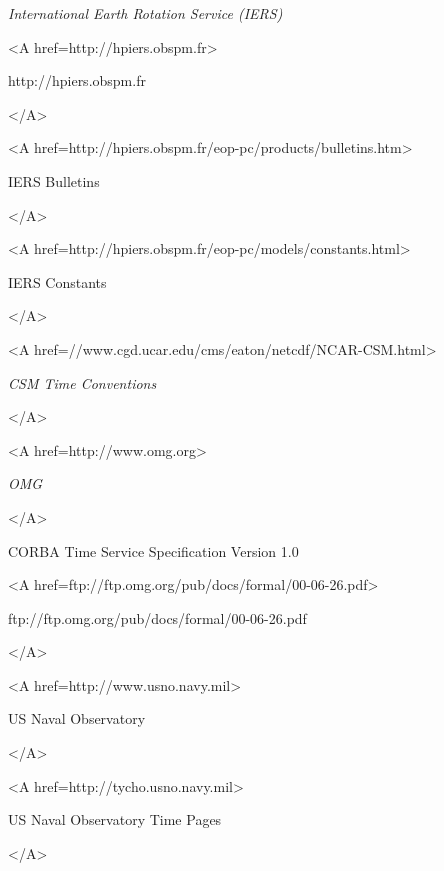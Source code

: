 \documentclass[english]{article}
\begin{document}
\def\refname{Reference Material}
\def\bibname{Reference Material}
\begin{thebibliography}{99}

\textsl{International Earth Rotation Service (IERS)}
\begin{rawhtml}<A href=http://hpiers.obspm.fr>\end{rawhtml}
http://hpiers.obspm.fr \\
\begin{rawhtml}</A>\end{rawhtml}
\begin{rawhtml}<A href=http://hpiers.obspm.fr/eop-pc/products/bulletins.htm>\end{rawhtml}
IERS Bulletins \\
\begin{rawhtml}</A>\end{rawhtml}
\begin{rawhtml}<A href=http://hpiers.obspm.fr/eop-pc/models/constants.html>\end{rawhtml}
IERS Constants \\
\begin{rawhtml}</A>\end{rawhtml}

\begin{rawhtml}<A href=//www.cgd.ucar.edu/cms/eaton/netcdf/NCAR-CSM.html>\end{rawhtml}
\textsl{CSM Time Conventions} 
\begin{rawhtml}</A>\end{rawhtml}

\begin{rawhtml}<A href=http://www.omg.org>\end{rawhtml}
\textsl{OMG\\} 
\begin{rawhtml}</A>\end{rawhtml}
CORBA Time Service Specification Version 1.0
\begin{rawhtml}<A href=ftp://ftp.omg.org/pub/docs/formal/00-06-26.pdf>\end{rawhtml}
ftp://ftp.omg.org/pub/docs/formal/00-06-26.pdf
\begin{rawhtml}</A>\end{rawhtml}

\begin{rawhtml}<A href=http://www.usno.navy.mil>\end{rawhtml}
US Naval Observatory\\
\begin{rawhtml}</A>\end{rawhtml}
\begin{rawhtml}<A href=http://tycho.usno.navy.mil>\end{rawhtml}
US Naval Observatory Time Pages\\
\begin{rawhtml}</A>\end{rawhtml}


\end{thebibliography}
\end{document}
